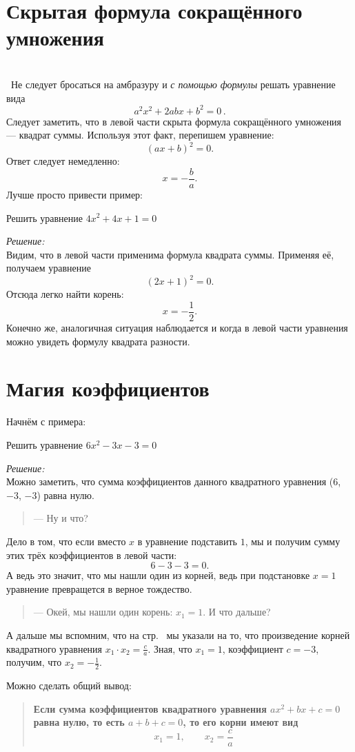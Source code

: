 \documentclass[11pt,fleqn]{book} %
\begin{document}
\section{Скрытая формула сокращённого умножения}
~\\~Не следует бросаться на амбразуру и \textit{с помощью формулы} решать уравнение вида $$\boxed{a^2x^2 + 2abx + b^2 = 0}\,.$$ Следует заметить, что в левой части скрыта формула сокращённого умножения --- квадрат суммы. Используя этот факт, перепишем уравнение: $$(ax+b)^2 = 0.$$ Ответ следует немедленно: $$x = -\frac{b}{a}.$$
Лучше просто привести пример:
\begin{example}
Решить уравнение $4x^2 + 4x + 1 = 0$
\end{example}
\textit{Решение:} \\
Видим, что в левой части применима формула квадрата суммы. Применяя её, получаем уравнение
$$(2x + 1)^2 = 0.$$ Отсюда легко найти корень: $$x = -\frac{1}{2}.$$ Конечно же, аналогичная ситуация наблюдается и когда в левой части уравнения можно увидеть формулу квадрата разности.

\section{Магия коэффициентов}
Начнём с примера:
\begin{example}
Решить уравнение $6x^2-3x-3 = 0$
\end{example}
\textit{Решение:} \\
Можно заметить, что сумма коэффициентов данного квадратного уравнения ($6$, $-3$, $-3$) равна нулю. 
\begin{quote}
--- Ну и что?
\end{quote}
Дело в том, что если вместо $x$ в уравнение подставить $1$, мы и получим сумму этих трёх коэффициентов в левой части: $$6-3-3 = 0.$$ А ведь это значит, что мы нашли один из корней, ведь при подстановке $x=1$ уравнение превращется в верное тождество. 
\begin{quote}
--- Окей, мы нашли один корень: $x_1 = 1$. И что дальше?
\end{quote}
А дальше мы вспомним, что на стр.~\pageref{com:viete} мы указали на то, что произведение корней квадратного уравнения $x_1\cdot x_2 = \frac{c}{a}$. Зная, что $x_1 = 1$, коэффициент $c = -3$, получим, что $x_2 = -\frac{1}{2}.$

Можно сделать общий вывод:
\begin{quote}
\textbf{Если сумма коэффициентов квадратного уравнения $ax^2+bx+c = 0$ равна нулю, то есть $\boxed{a+b+c = 0}$, то его корни имеют вид $$x_1 = 1, \qquad x_2 = \frac{c}{a}$$}
\end{quote}
\end{document}
